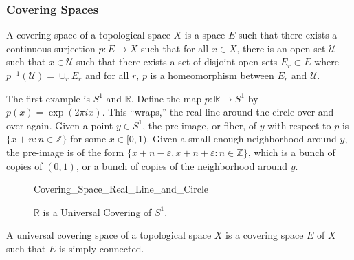 \documentclass[crop=false,class=book,oneside]{standalone}
\begin{document}
        \subsubsection{Covering Spaces}
            \begin{definition}
                A covering space of a
                topological space $X$
                is a space
                $E$ such that there exists
                a continuous surjection
                $p:E\rightarrow{X}$ such that
                for all $x\in{X}$, there is an
                open set $\mathcal{U}$ such that
                $x\in\mathcal{U}$ such that there
                exists a set of disjoint open sets
                $E_{r}\subset{E}$ where
                $p^{-1}(\mathcal{U})=\cup_{r}E_{r}$
                and for all $r$,
                $p$ is a homeomorphism between
                $E_{r}$ and $\mathcal{U}$.
            \end{definition}
            \begin{example}
                The first example is
                $S^{1}$ and $\mathbb{R}$.
                Define the map
                $p:\mathbb{R}\rightarrow{S^{1}}$
                by $p(x)=\exp(2\pi{i}x)$. This ``wraps,''
                the real line around the circle over and over again.
                Given a point $y\in{S^{1}}$, the pre-image, or fiber,
                of $y$ with respect to $p$ is
                $\{x+n:n\in\mathbb{Z}\}$ for some $x\in[0,1)$.
                Given a small enough neighborhood
                around $y$, the pre-image is of the form
                $\{x+n-\varepsilon,x+n+\varepsilon:n\in\mathbb{Z}\}$,
                which is a bunch of copies of $(0,1)$, or a bunch
                of copies of the neighborhood around $y$.
            \end{example}
            \begin{figure}[H]
                \centering
                \captionsetup{type=figure}
                
                          {Covering_Space_Real_Line_and_Circle}
                \caption{$\mathbb{R}$ is a Universal Covering of $S^{1}$.}
                \label{fig:Surgery_Theory_Reals_Cover_Circle}
            \end{figure}
            \begin{definition}
                A universal covering space of a topological space $X$
                is a covering space $E$ of $X$ such that
                $E$ is simply connected.
            \end{definition}
\end{document}
